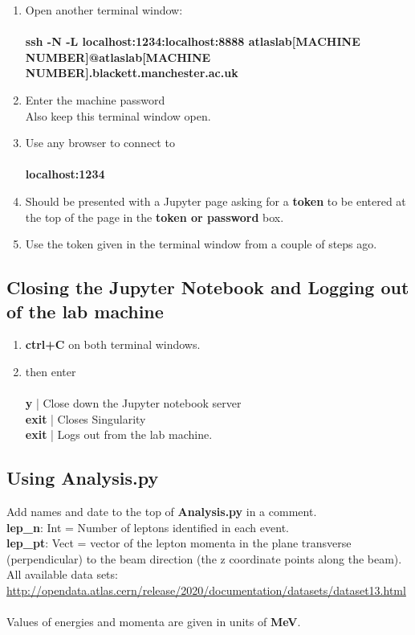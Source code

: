 \begin{enumerate}
    \item Open another terminal window:
    \\\\
    \textbf{ssh -N -L localhost:1234:localhost:8888 atlaslab[MACHINE NUMBER]@atlaslab[MACHINE NUMBER].blackett.manchester.ac.uk}

    \item Enter the machine password  \\
    Also keep this terminal window open.

    \item Use any browser to connect to 
    \\\\
    \textbf{localhost:1234}

    \item Should be presented with a Jupyter page asking for a \textbf{token} to be entered at the top of the page in the \textbf{token or password} box.

    \item Use the token given in the terminal window from a couple of steps ago.
\end{enumerate}

\subsection{Closing the Jupyter Notebook and Logging out of the lab machine}
\begin{enumerate}
    \item \textbf{ctrl+C} on both terminal windows.
    \item then enter
    \\\\
    \textbf{y} | Close down the Jupyter notebook server\\
    \textbf{exit} | Closes Singularity\\
    \textbf{exit} | Logs out from the lab machine.
\end{enumerate}

\subsection{Using Analysis.py}
Add names and date to the top of \textbf{Analysis.py} in a comment.\\
\textbf{lep\_n}: Int = Number of leptons identified in each event.\\
\textbf{lep\_pt}: Vect = vector of the lepton momenta in the plane transverse (perpendicular) to the beam direction (the z coordinate points along the beam).\\
All available data sets: \url{http://opendata.atlas.cern/release/2020/documentation/datasets/dataset13.html}\\\\
Values of energies and momenta are given in units of \textbf{MeV}.

